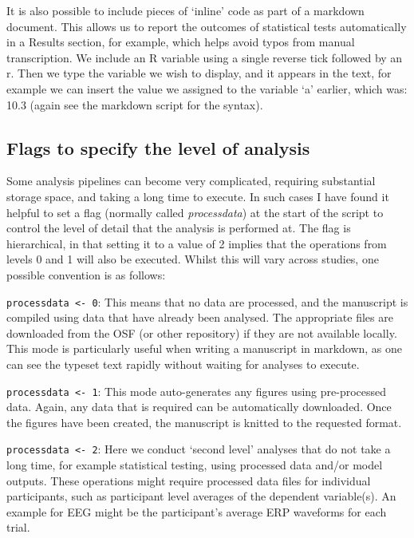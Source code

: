 \documentclass[
]{article}
\begin{document}
It is also possible to include pieces of `inline' code as part of a markdown document. This allows us to report the outcomes of statistical tests automatically in a Results section, for example, which helps avoid typos from manual transcription. We include an R variable using a single reverse tick followed by an r. Then we type the variable we wish to display, and it appears in the text, for example we can insert the value we assigned to the variable `a' earlier, which was: 10.3 (again see the markdown script for the syntax).

\hypertarget{flags-to-specify-the-level-of-analysis}{%
\subsection{Flags to specify the level of analysis}\label{flags-to-specify-the-level-of-analysis}}

Some analysis pipelines can become very complicated, requiring substantial storage space, and taking a long time to execute. In such cases I have found it helpful to set a flag (normally called \emph{processdata}) at the start of the script to control the level of detail that the analysis is performed at. The flag is hierarchical, in that setting it to a value of 2 implies that the operations from levels 0 and 1 will also be executed. Whilst this will vary across studies, one possible convention is as follows:

\texttt{processdata\ \textless{}-\ 0}: This means that no data are processed, and the manuscript is compiled using data that have already been analysed. The appropriate files are downloaded from the OSF (or other repository) if they are not available locally. This mode is particularly useful when writing a manuscript in markdown, as one can see the typeset text rapidly without waiting for analyses to execute.

\texttt{processdata\ \textless{}-\ 1}: This mode auto-generates any figures using pre-processed data. Again, any data that is required can be automatically downloaded. Once the figures have been created, the manuscript is knitted to the requested format.

\texttt{processdata\ \textless{}-\ 2}: Here we conduct `second level' analyses that do not take a long time, for example statistical testing, using processed data and/or model outputs. These operations might require processed data files for individual participants, such as participant level averages of the dependent variable(s). An example for EEG might be the participant's average ERP waveforms for each trial.
\end{document}
